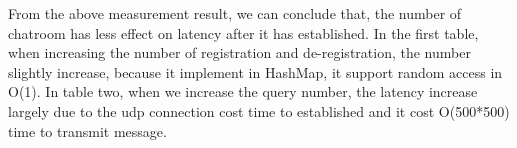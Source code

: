 \documentclass{article}
\begin{document}
\clearpage
From the above measurement result, we can conclude that, the number of chatroom has less effect on latency after it has established. In the first table, when increasing the number of registration and de-registration, the number slightly increase, because it implement in HashMap, it support random access in O(1). In table two, when we increase the query number, the latency increase largely due to the udp connection cost time to established and it cost O(500*500) time to transmit message.
\end{document}
